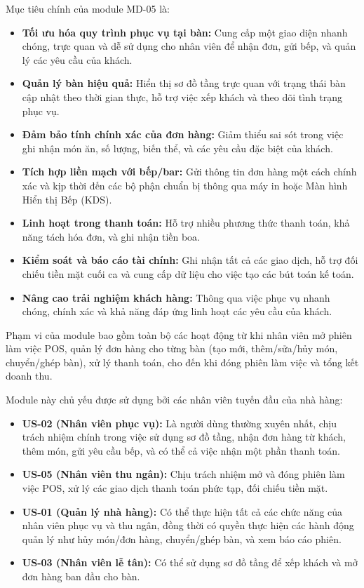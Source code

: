 \label{sssec:md05_objectives_scope}
Mục tiêu chính của module MD-05 là:
\begin{itemize}
    \item \textbf{Tối ưu hóa quy trình phục vụ tại bàn:} Cung cấp một giao diện nhanh chóng, trực quan và dễ sử dụng cho nhân viên để nhận đơn, gửi bếp, và quản lý các yêu cầu của khách.
    \item \textbf{Quản lý bàn hiệu quả:} Hiển thị sơ đồ tầng trực quan với trạng thái bàn cập nhật theo thời gian thực, hỗ trợ việc xếp khách và theo dõi tình trạng phục vụ.
    \item \textbf{Đảm bảo tính chính xác của đơn hàng:} Giảm thiểu sai sót trong việc ghi nhận món ăn, số lượng, biến thể, và các yêu cầu đặc biệt của khách.
    \item \textbf{Tích hợp liền mạch với bếp/bar:} Gửi thông tin đơn hàng một cách chính xác và kịp thời đến các bộ phận chuẩn bị thông qua máy in hoặc Màn hình Hiển thị Bếp (KDS).
    \item \textbf{Linh hoạt trong thanh toán:} Hỗ trợ nhiều phương thức thanh toán, khả năng tách hóa đơn, và ghi nhận tiền boa.
    \item \textbf{Kiểm soát và báo cáo tài chính:} Ghi nhận tất cả các giao dịch, hỗ trợ đối chiếu tiền mặt cuối ca và cung cấp dữ liệu cho việc tạo các bút toán kế toán.
    \item \textbf{Nâng cao trải nghiệm khách hàng:} Thông qua việc phục vụ nhanh chóng, chính xác và khả năng đáp ứng linh hoạt các yêu cầu của khách.
\end{itemize}
Phạm vi của module bao gồm toàn bộ các hoạt động từ khi nhân viên mở phiên làm việc POS, quản lý đơn hàng cho từng bàn (tạo mới, thêm/sửa/hủy món, chuyển/ghép bàn), xử lý thanh toán, cho đến khi đóng phiên làm việc và tổng kết doanh thu.

\label{sssec:md05_primary_users}
Module này chủ yếu được sử dụng bởi các nhân viên tuyến đầu của nhà hàng:
\begin{itemize}
    \item \textbf{US-02 (Nhân viên phục vụ):} Là người dùng thường xuyên nhất, chịu trách nhiệm chính trong việc sử dụng sơ đồ tầng, nhận đơn hàng từ khách, thêm món, gửi yêu cầu bếp, và có thể cả việc nhận một phần thanh toán.
    \item \textbf{US-05 (Nhân viên thu ngân):} Chịu trách nhiệm mở và đóng phiên làm việc POS, xử lý các giao dịch thanh toán phức tạp, đối chiếu tiền mặt.
    \item \textbf{US-01 (Quản lý nhà hàng):} Có thể thực hiện tất cả các chức năng của nhân viên phục vụ và thu ngân, đồng thời có quyền thực hiện các hành động quản lý như hủy món/đơn hàng, chuyển/ghép bàn, và xem báo cáo phiên.
    \item \textbf{US-03 (Nhân viên lễ tân):} Có thể sử dụng sơ đồ tầng để xếp khách và mở đơn hàng ban đầu cho bàn.
\end{itemize}

